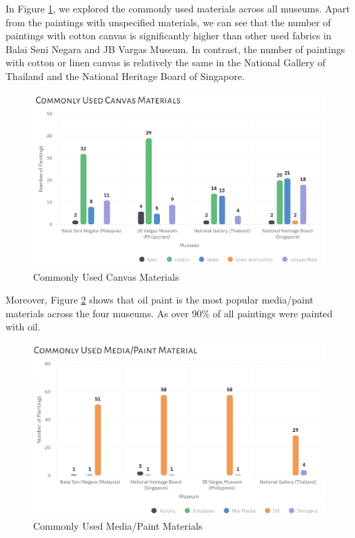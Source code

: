\documentclass[11pt, oneside]{article}
\begin{document}
\noindent In Figure \ref{canvas_material}, we explored the commonly used materials across all museums. Apart from the paintings with unspecified materials, we can see that the number of paintings with cotton canvas is significantly higher than other used fabrics in Balai Seni Negara and JB Vargas Museum. In contrast, the number of paintings with cotton or linen canvas is relatively the same in the National Gallery of Thailand and the National Heritage Board of Singapore.

\begin{figure}[H]
    \centering
    \includegraphics[scale=0.55]{images/canvas_material.png}
    \caption{Commonly Used Canvas Materials}
    \label{canvas_material}
\end{figure}

\noindent Moreover, Figure \ref{media_material} shows that oil paint is the most popular media/paint materials across the four museums. As over 90\% of all paintings were painted with oil.

\begin{figure}[H]
    \centering
    \includegraphics[scale=0.55]{images/media_material.png}
    \caption{Commonly Used Media/Paint Materials}
    \label{media_material}
\end{figure}
\end{document}
